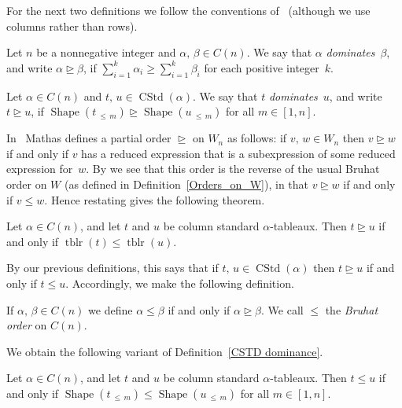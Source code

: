 \documentclass[ALCO,ThmDefs,Unicode,epreuves]{cedram}
\DeclareMathOperator{\perm}{tblr}
\newcommand{\Lessthan}[2]{#1\,{_{\leqslant\,#2}}}
\DeclareMathOperator{\CSTD}{CStd}
\DeclareMathOperator{\shape}{Shape}
\begin{document}
For the next two definitions we follow the conventions of~\cite{math:heckeA}
(although we use columns rather than rows).

\begin{defi}\label{Dominance Order}
Let $n$ be a nonnegative integer and $\alpha,\,\beta \in C(n) $. We say that
$\alpha$ \emph{dominates}~$\beta$,
and write $\alpha \trianglerighteq \beta $, if $\sum_{i=1}^{k} \alpha_i \geqslant
\sum_{i=1}^{k} \beta_i$ for each positive integer~$k$.
\end{defi}

\begin{defi}\label{CSTD dominance}
Let $\alpha\in C(n)$ and $t,\,u\in\CSTD(\alpha)$. We say that
$t$ \emph{dominates}~$u$, and write $t\trianglerighteq u$, if
$\shape(\Lessthan tm)\trianglerighteq\shape(\Lessthan um)$ for all $m\in[1,n]$.
\end{defi}

In~\cite{math:heckeA} Mathas defines a partial order $\trianglerighteq$ on
$W_n$ as follows: if $v,\,w\in W_n$ then $v\trianglerighteq w$ if and
only if $v$ has a reduced expression that is a subexpression of some reduced expression
for~$w$. By \cite[Theorem~1.1]{deodhar:bruhat} we see that this order is
the reverse of the usual Bruhat order on $W$ (as defined in Definition~\ref{Orders_on_W}),
in that $v\trianglerighteq w$ if and only if $v\leqslant w$. Hence restating
\cite[Theorem~3.8]{math:heckeA} gives the following theorem.

\begin{theo}\label{equidombruhatold}
Let $\alpha\in C(n)$, and let $t$ and $u$ be column standard
$\alpha$-tableaux. Then $t\trianglerighteq u$ if and only if
$\perm(t) \leqslant \perm(u)$.
\end{theo}

By our previous definitions, this says that if $t,\,u\in\CSTD(\alpha)$
then $t\trianglerighteq u$ if and only if $t\leqslant u$. Accordingly,
we make the following definition.
\begin{defi}\label{BruhatforC(n)}
If $\alpha,\,\beta\in C(n)$ we define $\alpha\leqslant\beta$
if and only if $\alpha\trianglerighteq\beta$. We call $\leqslant$ the
\emph{Bruhat order} on $C(n)$.
\end{defi}
We obtain the following variant of Definition~\ref{CSTD dominance}.

\begin{prop}\label{equidombruhat}
Let $\alpha\in C(n)$, and let $t$ and $u$ be column standard
$\alpha$-tableaux. Then $t\leqslant u$ if and only if
$\shape(\Lessthan tm)\leqslant\shape(\Lessthan um)$ for all $m\in[1,n]$.
\end{prop}
\end{document}
